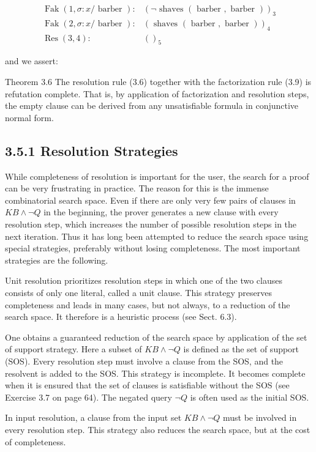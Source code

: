\documentclass[10pt]{article}
\begin{document}
$$
\begin{aligned}
\operatorname{Fak}(1, \sigma: x / \text { barber }): & (\neg \text { shaves }(\text { barber }, \text { barber }))_{3} \\
\operatorname{Fak}(2, \sigma: x / \text { barber }): & (\text { shaves }(\text { barber }, \text { barber }))_{4} \\
\operatorname{Res}(3,4): & ()_{5}
\end{aligned}
$$

and we assert:

Theorem 3.6 The resolution rule (3.6) together with the factorization rule (3.9) is refutation complete. That is, by application of factorization and resolution steps, the empty clause can be derived from any unsatisfiable formula in conjunctive normal form.

\subsection*{3.5.1 Resolution Strategies}
While completeness of resolution is important for the user, the search for a proof can be very frustrating in practice. The reason for this is the immense combinatorial search space. Even if there are only very few pairs of clauses in $K B \wedge \neg Q$ in the beginning, the prover generates a new clause with every resolution step, which increases the number of possible resolution steps in the next iteration. Thus it has long been attempted to reduce the search space using special strategies, preferably without losing completeness. The most important strategies are the following.

Unit resolution prioritizes resolution steps in which one of the two clauses consists of only one literal, called a unit clause. This strategy preserves completeness and leads in many cases, but not always, to a reduction of the search space. It therefore is a heuristic process (see Sect. 6.3).

One obtains a guaranteed reduction of the search space by application of the set of support strategy. Here a subset of $K B \wedge \neg Q$ is defined as the set of support (SOS). Every resolution step must involve a clause from the SOS, and the resolvent is added to the SOS. This strategy is incomplete. It becomes complete when it is ensured that the set of clauses is satisfiable without the SOS (see Exercise 3.7 on page 64). The negated query $\neg Q$ is often used as the initial SOS.

In input resolution, a clause from the input set $K B \wedge \neg Q$ must be involved in every resolution step. This strategy also reduces the search space, but at the cost of completeness.
\end{document}

